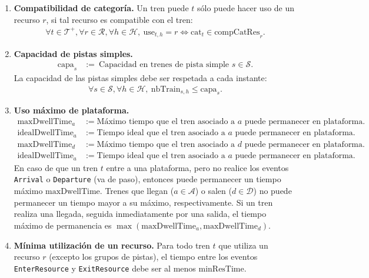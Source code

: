 \documentclass[letter, 10pt]{article}
\begin{document}
\begin{description}
    \begin{enumerate}
        \item \textbf{Compatibilidad de categoría.} Un tren puede $t$ sólo puede hacer uso de un recurso $r$, si tal recurso es compatible con el tren:
        \begin{align*}
            \forall t \in \mathcal{T}^+, \forall r \in \mathcal{R}, \forall h \in \mathcal{H}, \ \text{use}_{t,h} = r \Leftrightarrow \text{cat}_t \in \text{compCatRes}_r.
        \end{align*}
        \item \textbf{Capacidad de pistas simples.}
        \begin{align*}
            \text{capa}_s &:= \ \text{Capacidad en trenes de pista simple } s \in \mathcal{S}.
        \end{align*}
        La capacidad de las pistas simples debe ser respetada a cada instante:
        \begin{align*}
            \forall s \in \mathcal{S}, \forall h \in \mathcal{H}, \ \text{nbTrain}_{s,h} \leq \text{capa}_s.
        \end{align*}
        \item \textbf{Uso máximo de plataforma.}
        \begin{align*}
            \text{maxDwellTime}_a &:= \text{Máximo tiempo que el tren asociado a } a \text{ puede permanecer en plataforma.} \\
            \text{idealDwellTime}_a &:= \text{Tiempo ideal que el tren asociado a } a \text{ puede permanecer en plataforma.}\\
            \text{maxDwellTime}_d &:= \text{Máximo tiempo que el tren asociado a } d \text{ puede permanecer en plataforma.} \\
            \text{idealDwellTime}_a &:= \text{Tiempo ideal que el tren asociado a } a \text{ puede permanecer en plataforma.}
        \end{align*}
        En caso de que un tren $t$ entre a una plataforma, pero no realice los eventos \texttt{Arrival} o \texttt{Departure} (va de paso), entonces puede permanecer un tiempo máximo $\text{maxDwellTime}$. Trenes que llegan ($a \in \mathcal{A}$) o salen ($d \in \mathcal{D}$) no puede permanecer un tiempo mayor a su máximo, respectivamente. Si un tren realiza una llegada, seguida inmediatamente por una salida, el tiempo máximo de permanencia es $\max(\text{maxDwellTime}_a, \text{maxDwellTime}_d)$.
        \item \textbf{Mínima utilización de un recurso.} Para todo tren $t$ que utiliza un recurso $r$ (excepto los grupos de pistas), el tiempo entre los eventos \texttt{EnterResource} y \texttt{ExitResource} debe ser al menos $\text{minResTime}$.

\end{enumerate}
\end{description}
\end{document}
